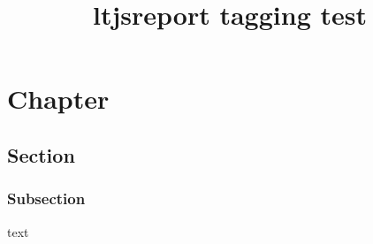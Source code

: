 \documentclass{ltjsreport}
\title{ltjsreport tagging test}
\begin{document}
\tableofcontents

\chapter{Chapter}
\section{Section}
\subsection{Subsection}
text
\end{document}
